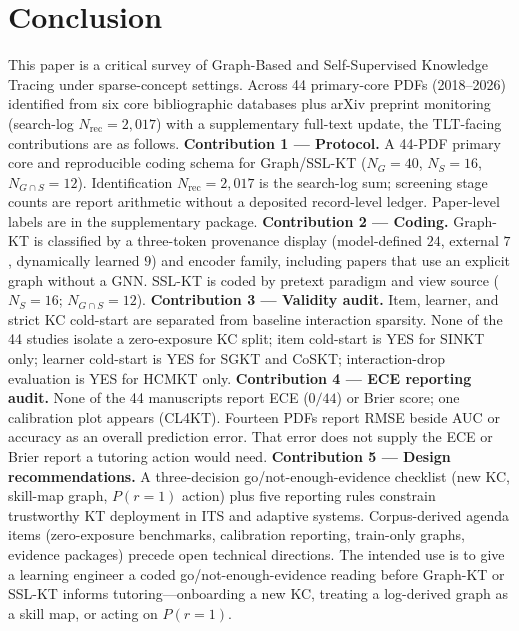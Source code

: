 \documentclass[lettersize,journal]{IEEEtran}
\begin{document}
\section{Conclusion}
\label{sec:conclusion}
This paper is a critical survey of Graph-Based and Self-Supervised Knowledge Tracing under sparse-concept settings. Across 44 primary-core PDFs (2018--2026) identified from six core bibliographic databases plus arXiv preprint monitoring (search-log $N_{\mathrm{rec}} = 2{,}017$) with a supplementary full-text update, the TLT-facing contributions are as follows.
\textbf{Contribution 1 --- Protocol.} A 44-PDF primary core and reproducible coding schema for Graph/SSL-KT ($N_G=40$, $N_S=16$, $N_{G \cap S}=12$). Identification $N_{\mathrm{rec}}=2{,}017$ is the search-log sum; screening stage counts are report arithmetic without a deposited record-level ledger. Paper-level labels are in the supplementary package.
\textbf{Contribution 2 --- Coding.} Graph-KT is classified by a three-token provenance display (model-defined $24$, external $7$, dynamically learned $9$) and encoder family, including papers that use an explicit graph without a GNN. SSL-KT is coded by pretext paradigm and view source ($N_S=16$; $N_{G\cap S}=12$).
\textbf{Contribution 3 --- Validity audit.} Item, learner, and strict KC cold-start are separated from baseline interaction sparsity. None of the 44 studies isolate a zero-exposure KC split; item cold-start is YES for SINKT only; learner cold-start is YES for SGKT and CoSKT; interaction-drop evaluation is YES for HCMKT only.
\textbf{Contribution 4 --- ECE reporting audit.} None of the 44 manuscripts report ECE ($0/44$) or Brier score; one calibration plot appears (CL4KT). Fourteen PDFs report RMSE beside AUC or accuracy as an overall prediction error. That error does not supply the ECE or Brier report a tutoring action would need.
\textbf{Contribution 5 --- Design recommendations.} A three-decision go/not-enough-evidence checklist (new KC, skill-map graph, $P(r=1)$ action) plus five reporting rules constrain trustworthy KT deployment in ITS and adaptive systems. Corpus-derived agenda items (zero-exposure benchmarks, calibration reporting, train-only graphs, evidence packages) precede open technical directions.
The intended use is to give a learning engineer a coded go/not-enough-evidence reading before Graph-KT or SSL-KT informs tutoring---onboarding a new KC, treating a log-derived graph as a skill map, or acting on $P(r=1)$.
\appendices
\end{document}
